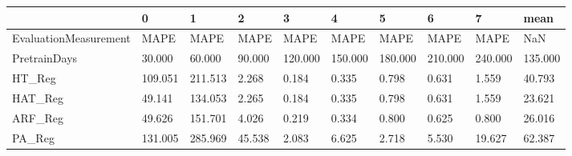 \begin{tabular}{llllllllll}
\toprule
{} &       0 &       1 &      2 &       3 &       4 &       5 &       6 &       7 &    mean \\
\midrule
EvaluationMeasurement &    MAPE &    MAPE &   MAPE &    MAPE &    MAPE &    MAPE &    MAPE &    MAPE &     NaN \\
PretrainDays          &  30.000 &  60.000 & 90.000 & 120.000 & 150.000 & 180.000 & 210.000 & 240.000 & 135.000 \\
HT\_Reg                & 109.051 & 211.513 &  2.268 &   0.184 &   0.335 &   0.798 &   0.631 &   1.559 &  40.793 \\
HAT\_Reg               &  49.141 & 134.053 &  2.265 &   0.184 &   0.335 &   0.798 &   0.631 &   1.559 &  23.621 \\
ARF\_Reg               &  49.626 & 151.701 &  4.026 &   0.219 &   0.334 &   0.800 &   0.625 &   0.800 &  26.016 \\
PA\_Reg                & 131.005 & 285.969 & 45.538 &   2.083 &   6.625 &   2.718 &   5.530 &  19.627 &  62.387 \\
\bottomrule
\end{tabular}
